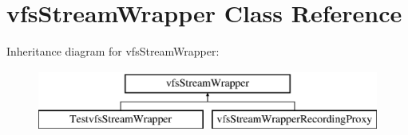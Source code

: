 \hypertarget{classorg_1_1bovigo_1_1vfs_1_1vfs_stream_wrapper}{}\section{vfs\+Stream\+Wrapper Class Reference}
\label{classorg_1_1bovigo_1_1vfs_1_1vfs_stream_wrapper}
Inheritance diagram for vfs\+Stream\+Wrapper\+:\begin{figure}[H]
\begin{center}
\leavevmode
\includegraphics[height=2.000000cm]{classorg_1_1bovigo_1_1vfs_1_1vfs_stream_wrapper}
\end{center}
\end{figure}
